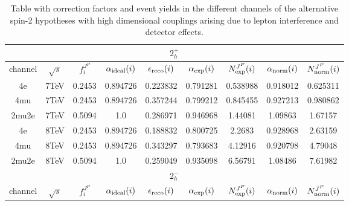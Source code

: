 \begin{table}[b]
\centering
\caption{
Table with correction factors and event yields in the different
channels of the alternative spin-2 hypotheses with high dimensional
couplings arising due to lepton interference and detector effects.}
\begin{tabular}{c c c c c c c c c} %
\hline \hline
\multicolumn{9}{|c|}{$2^{+}_{h}$} \\ \hline 
channel & $\sqrt{s}$ & $f_{i}^{J^P}$ & $\alpha_{\rm ideal} (i)$ & $\epsilon_{\rm reco} (i)$ & $\alpha_{\rm exp} (i)$ & $N^{J^P}_{\rm exp} (i)$ & $\alpha_{\rm norm} (i)$ & $N^{J^P}_{\rm norm} (i)$\\ \hline 
4e & 7TeV & 0.2453 & 0.894726 & 0.223832 & 0.791281
 & 0.538988%
 & 0.918012 & 0.625311 \\ \hline 4mu & 7TeV & 0.2453 & 0.894726 & 0.357244 & 0.799212
 & 0.845455%
 & 0.927213 & 0.980862 \\ \hline 2mu2e & 7TeV & 0.5094 & 1.0  & 0.286971 & 0.946968
 & 1.44081%
 & 1.09863 & 1.67157 \\ \hline \hline 
4e & 8TeV & 0.2453 & 0.894726 & 0.188832 & 0.800725
 & 2.2683%
 & 0.928968 & 2.63159 \\ \hline 4mu & 8TeV & 0.2453 & 0.894726 & 0.343297 & 0.793683
 & 4.12916%
 & 0.920798 & 4.79048 \\ \hline 2mu2e & 8TeV & 0.5094 & 1.0  & 0.259049 & 0.935098
 & 6.56791%
 & 1.08486 & 7.61982 \\ \hline \hline 
 \multicolumn{9}{|c|}{$2^{-}_{h}$} \\ \hline 
channel & $\sqrt{s}$ & $f_{i}^{J^P}$ & $\alpha_{\rm ideal} (i)$ & $\epsilon_{\rm reco} (i)$ & $\alpha_{\rm exp} (i)$ & $N^{J^P}_{\rm exp} (i)$ & $\alpha_{\rm norm} (i)$ & $N^{J^P}_{\rm norm} (i)$\\ \hline 

\end{tabular}
\end{table}
